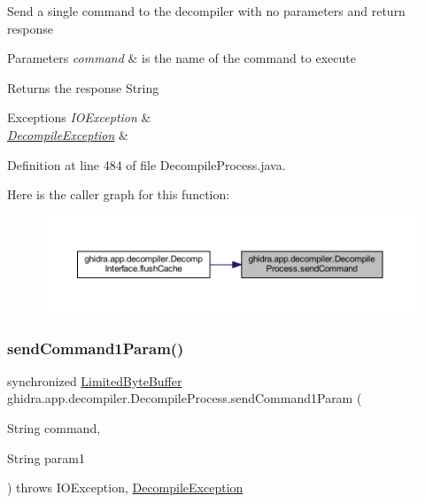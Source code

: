 Send a single command to the decompiler with no parameters and return response 
\begin{DoxyParams}{Parameters}
{\em command} & is the name of the command to execute \\
\hline
\end{DoxyParams}
\begin{DoxyReturn}{Returns}
the response String 
\end{DoxyReturn}

\begin{DoxyExceptions}{Exceptions}
{\em I\+O\+Exception} & \\
\hline
{\em \mbox{\hyperlink{classghidra_1_1app_1_1decompiler_1_1_decompile_exception}{Decompile\+Exception}}} & \\
\hline
\end{DoxyExceptions}


Definition at line 484 of file Decompile\+Process.\+java.

Here is the caller graph for this function\+:
\nopagebreak
\begin{figure}[H]
\begin{center}
\leavevmode
\includegraphics[width=350pt]{classghidra_1_1app_1_1decompiler_1_1_decompile_process_a36fc409f22c26d36509fc3c06a8b9f93_icgraph}
\end{center}
\end{figure}
\mbox{\label{classghidra_1_1app_1_1decompiler_1_1_decompile_process_a07d6213d3257b394022e7b8d13a3746e}} 
\subsubsection{\texorpdfstring{sendCommand1Param()}{sendCommand1Param()}}
{\footnotesize\ttfamily synchronized \mbox{\hyperlink{classghidra_1_1app_1_1decompiler_1_1_limited_byte_buffer}{Limited\+Byte\+Buffer}} ghidra.\+app.\+decompiler.\+Decompile\+Process.\+send\+Command1\+Param (\begin{DoxyParamCaption}\item[{String}]{command,  }\item[{String}]{param1 }\end{DoxyParamCaption}) throws I\+O\+Exception, 			\mbox{\hyperlink{classghidra_1_1app_1_1decompiler_1_1_decompile_exception}{Decompile\+Exception}}\hspace{0.3cm}{\ttfamily [inline]}}

